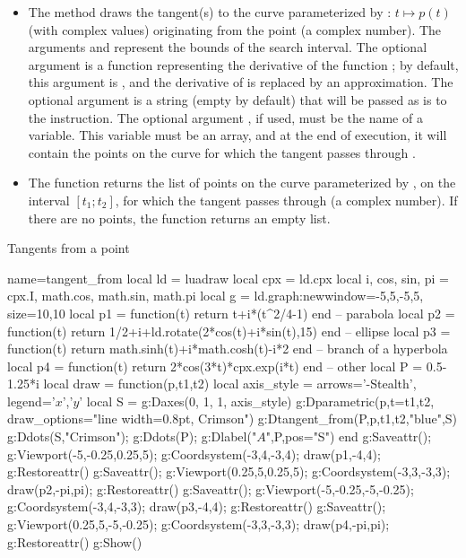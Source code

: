 \begin{itemize}
    \item The method  draws the tangent(s) to the curve parameterized by : \(t \mapsto p(t)\) (with complex values) originating from the point  (a complex number). The arguments  and  represent the bounds of the search interval. The optional argument  is a function representing the derivative of the function ; by default, this argument is \nil, and the derivative of  is replaced by an approximation. The optional argument  is a string (empty by default) that will be passed as is to the \drawcmd instruction. The optional argument , if used, must be the name of a variable. This variable must be an array, and at the end of execution, it will contain the points on the curve for which the tangent passes through . \arguScale

    \item The function  returns the list of points on the curve parameterized by , on the interval \([t_1;t_2]\), for which the tangent passes through  (a complex number). If there are no points, the function returns an empty list.
\end{itemize}

\begin{demo}{Tangents from a point}
\begin{luadraw}{name=tangent_from}
local ld = luadraw
local cpx = ld.cpx
local i, cos, sin, pi = cpx.I, math.cos, math.sin, math.pi
local g = ld.graph:new{window={-5,5,-5,5}, size={10,10}}
local p1 = function(t) return t+i*(t^2/4-1) end -- parabola
local p2 = function(t) return 1/2+i+ld.rotate(2*cos(t)+i*sin(t),15) end -- ellipse
local p3 = function(t) return math.sinh(t)+i*math.cosh(t)-i*2 end -- branch of a hyperbola
local p4 = function(t) return 2*cos(3*t)*cpx.exp(i*t) end -- other
local P = 0.5-1.25*i
local draw = function(p,t1,t2)
    local axis_style = { arrows='-Stealth', legend={'$x$','$y$'} }
    local S = {}
    g:Daxes({0, 1, 1}, axis_style)
    g:Dparametric(p,{t={t1,t2}, draw_options="line width=0.8pt, Crimson"})
    g:Dtangent_from(P,p,t1,t2,"blue",S)
    g:Ddots(S,"Crimson"); g:Ddots(P); g:Dlabel("$A$",P,{pos="S"})
end
g:Saveattr(); g:Viewport(-5,-0.25,0.25,5); g:Coordsystem(-3,4,-3,4); draw(p1,-4,4); g:Restoreattr()
g:Saveattr(); g:Viewport(0.25,5,0.25,5); g:Coordsystem(-3,3,-3,3); draw(p2,-pi,pi); g:Restoreattr()
g:Saveattr(); g:Viewport(-5,-0.25,-5,-0.25); g:Coordsystem(-3,4,-3,3); draw(p3,-4,4); g:Restoreattr()
g:Saveattr(); g:Viewport(0.25,5,-5,-0.25); g:Coordsystem(-3,3,-3,3); draw(p4,-pi,pi); g:Restoreattr()
g:Show()
\end{luadraw}
\end{demo}

